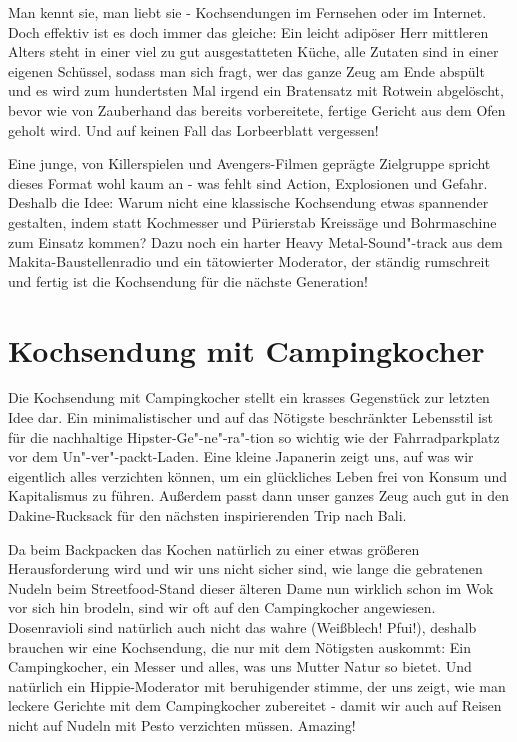 \documentclass[a5paper,pagesize,10pt,bibtotoc,pointlessnumbers,normalheadings,DIV=9,twoside=false]{scrbook}
\begin{document}
Man kennt sie, man liebt sie - Kochsendungen im Fernsehen oder im Internet.
Doch effektiv ist es doch immer das gleiche:
Ein leicht adipöser Herr mittleren Alters steht in einer viel zu gut ausgestatteten Küche, alle Zutaten sind in einer eigenen Schüssel, sodass man sich fragt, wer das ganze Zeug am Ende abspült und es wird zum hundertsten Mal irgend ein Bratensatz mit Rotwein abgelöscht, bevor wie von Zauberhand das bereits vorbereitete, fertige Gericht aus dem Ofen geholt wird.
Und auf keinen Fall das Lorbeerblatt vergessen!

Eine junge, von Killerspielen und Avengers-Filmen geprägte Zielgruppe spricht dieses Format wohl kaum an - was fehlt sind Action, Explosionen und Gefahr.
Deshalb die Idee: Warum nicht eine klassische Kochsendung etwas spannender gestalten, indem statt Kochmesser und Pürierstab Kreissäge und Bohrmaschine zum Einsatz kommen?
Dazu noch ein harter Heavy Metal-Sound"-track aus dem Makita-Baustellenradio und ein tätowierter Moderator, der ständig rumschreit und fertig ist die Kochsendung für die nächste Generation!

\chapter{Kochsendung mit Campingkocher}

Die Kochsendung mit Campingkocher stellt ein krasses Gegenstück zur letzten Idee dar.
Ein minimalistischer und auf das Nötigste beschränkter Lebensstil ist für die nachhaltige Hipster-Ge"-ne"-ra"-tion so wichtig wie der Fahrradparkplatz vor dem Un"-ver"-packt-Laden.
Eine kleine Japanerin zeigt uns, auf was wir eigentlich alles verzichten können, um ein glückliches Leben frei von Konsum und Kapitalismus zu führen.
Außerdem passt dann unser ganzes Zeug auch gut in den Dakine-Rucksack für den nächsten inspirierenden Trip nach Bali.

Da beim Backpacken das Kochen natürlich zu einer etwas größeren Herausforderung wird und wir uns nicht sicher sind, wie lange die gebratenen Nudeln beim Streetfood-Stand dieser älteren Dame nun wirklich schon im Wok vor sich hin brodeln, sind wir oft auf den Campingkocher angewiesen.
Dosenravioli sind natürlich auch nicht das wahre (Weißblech! Pfui!), deshalb brauchen wir eine Kochsendung, die nur mit dem Nötigsten auskommt:
Ein Campingkocher, ein Messer und alles, was uns Mutter Natur so bietet.
Und natürlich ein Hippie-Moderator mit beruhigender stimme, der uns zeigt, wie man leckere Gerichte mit dem Campingkocher zubereitet - damit wir auch auf Reisen nicht auf Nudeln mit Pesto verzichten müssen.
Amazing!
\end{document}
